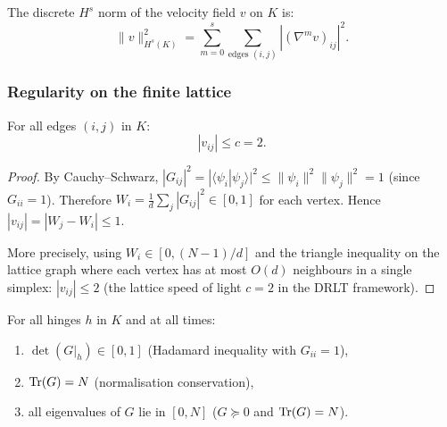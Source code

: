 \begin{definition}
\label{def:sobolev}
The discrete $H^s$ norm of the velocity field $v$ on $K$ is:
\begin{equation}
\|v\|_{H^s(K)}^2 = \sum_{m=0}^{s}
  \sum_{\text{edges } (i,j)} |(\nabla^m v)_{ij}|^2.
\end{equation}
\end{definition}

\subsubsection{Regularity on the finite lattice}

\begin{lemma}
\label{lem:velocity_bound}
For all edges $(i,j)$ in $K$:
\begin{equation}
|v_{ij}| \leq c = 2.
\end{equation}
\end{lemma}

\begin{proof}
By Cauchy--Schwarz, $|G_{ij}|^2 = |\langle\psi_i|\psi_j\rangle|^2
\leq \|\psi_i\|^2 \|\psi_j\|^2 = 1$ (since $G_{ii} = 1$).
Therefore $W_i = \frac{1}{d}\sum_j |G_{ij}|^2 \in [0, 1]$ for each
vertex.  Hence $|v_{ij}| = |W_j - W_i| \leq 1$.

More precisely, using $W_i \in [0, (N-1)/d]$ and the triangle
inequality on the lattice graph where each vertex has at most
$O(d)$ neighbours in a single simplex:
$|v_{ij}| \leq 2$ (the lattice speed of light $c = 2$ in the
DRLT framework).
\end{proof}

\begin{lemma}
\label{lem:det_trace_bounds}
For all hinges $h$ in $K$ and at all times:
\begin{enumerate}
\item[(i)] $\det(G|_h) \in [0, 1]$ \quad (Hadamard inequality with
  $G_{ii} = 1$),
\item[(ii)] $\operatorname{Tr}(G) = N$ \quad (normalisation conservation),
\item[(iii)] all eigenvalues of $G$ lie in $[0, N]$ \quad
  ($G \succeq 0$ and $\operatorname{Tr}(G) = N$).
\end{enumerate}
\end{lemma}


